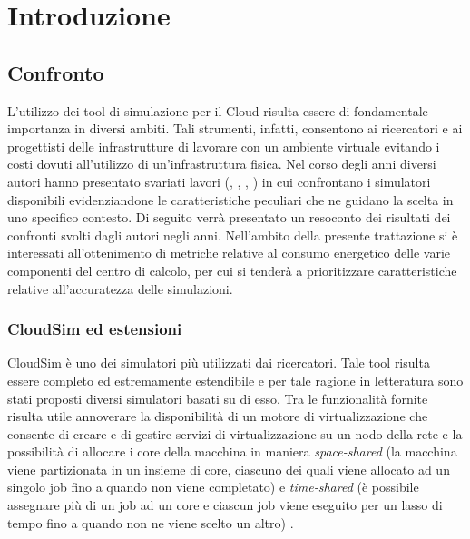
\chapter{Introduzione}

\begin{citazione}
\end{citazione}
\newpage

\section{Confronto} { 
L'utilizzo dei tool di simulazione per il Cloud risulta essere di fondamentale importanza in diversi ambiti. Tali strumenti, infatti, consentono ai ricercatori e ai progettisti delle infrastrutture di lavorare con un ambiente virtuale evitando i costi dovuti all'utilizzo di un'infrastruttura fisica. Nel corso degli anni diversi autori hanno presentato svariati lavori (\cite{mansouri2020cloud}, \cite{suryateja2016comparative}, \cite{abreu2020comparative}, \cite{khalil2017cloud}) in cui confrontano i simulatori disponibili evidenziandone le caratteristiche peculiari che ne guidano la scelta in uno specifico contesto. Di seguito verrà presentato un resoconto dei risultati dei confronti svolti dagli autori negli anni. 
Nell'ambito della presente trattazione si è interessati all'ottenimento di metriche relative al consumo energetico delle varie componenti del centro di calcolo, per cui si tenderà a prioritizzare caratteristiche relative all'accuratezza delle simulazioni.
\subsection{CloudSim ed estensioni}
CloudSim \cite{calheiros2011cloudsim} è uno dei simulatori più utilizzati dai ricercatori. Tale tool risulta essere completo ed estremamente estendibile e per tale ragione in letteratura sono stati proposti diversi simulatori basati su di esso. Tra le funzionalità fornite risulta utile annoverare la disponibilità di un motore di virtualizzazione che consente di creare e di gestire servizi di virtualizzazione su un nodo della rete e la possibilità di allocare i core della macchina in maniera \emph{space-shared} (la macchina viene partizionata in un insieme di core, ciascuno dei quali viene allocato ad un singolo job fino a quando non viene completato) e \emph{time-shared} (è possibile assegnare più di un job ad un core e ciascun job viene eseguito per un lasso di tempo fino a quando non ne viene scelto un altro) \cite{mansouri2020cloud}. 
}
